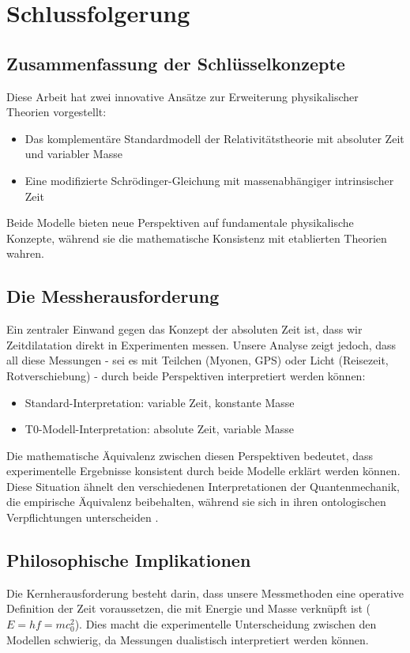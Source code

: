 \documentclass[a4paper,12pt]{article}
\begin{document}
	\section{Schlussfolgerung}
	
	\subsection{Zusammenfassung der Schlüsselkonzepte}
	Diese Arbeit hat zwei innovative Ansätze zur Erweiterung physikalischer Theorien vorgestellt:
	
	\begin{itemize}
		\item Das komplementäre Standardmodell der Relativitätstheorie mit absoluter Zeit und variabler Masse
		\item Eine modifizierte Schrödinger-Gleichung mit massenabhängiger intrinsischer Zeit
	\end{itemize}
	
	Beide Modelle bieten neue Perspektiven auf fundamentale physikalische Konzepte, während sie die mathematische Konsistenz mit etablierten Theorien wahren.
	
	\subsection{Die Messherausforderung}
	Ein zentraler Einwand gegen das Konzept der absoluten Zeit ist, dass wir Zeitdilatation direkt in Experimenten messen. Unsere Analyse zeigt jedoch, dass all diese Messungen - sei es mit Teilchen (Myonen, GPS) oder Licht (Reisezeit, Rotverschiebung) - durch beide Perspektiven interpretiert werden können:
	
	\begin{itemize}
		\item Standard-Interpretation: variable Zeit, konstante Masse
		\item T0-Modell-Interpretation: absolute Zeit, variable Masse
	\end{itemize}
	
	Die mathematische Äquivalenz zwischen diesen Perspektiven bedeutet, dass experimentelle Ergebnisse konsistent durch beide Modelle erklärt werden können. Diese Situation ähnelt den verschiedenen Interpretationen der Quantenmechanik, die empirische Äquivalenz beibehalten, während sie sich in ihren ontologischen Verpflichtungen unterscheiden \cite{Schlosshauer2013}.
	
	\subsection{Philosophische Implikationen}
	Die Kernherausforderung besteht darin, dass unsere Messmethoden eine operative Definition der Zeit voraussetzen, die mit Energie und Masse verknüpft ist ($E = h f = m c_0^2$). Dies macht die experimentelle Unterscheidung zwischen den Modellen schwierig, da Messungen dualistisch interpretiert werden können.
	
\end{document}
